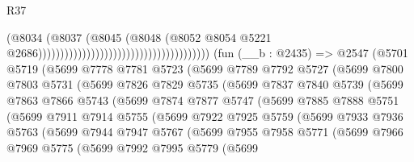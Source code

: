 \begin{lexlean}{R37}
\begin{coremodule}
                                                                        (@8034
                                                                          (@8037
                                                                            (@8045
                                                                              (@8048
                                                                                (@8052
                                                                                  @8054
                                                                                  @5221
                                                                                  @2686)))))))))))))))))))))))))))))))))))))))
    (fun (__b : @2435) =>
    @2547
      (@5701
        @5719
        (@5699
          @7778
          @7781
          @5723
          (@5699
            @7789
            @7792
            @5727
            (@5699
              @7800
              @7803
              @5731
              (@5699
                @7826
                @7829
                @5735
                (@5699
                  @7837
                  @7840
                  @5739
                  (@5699
                    @7863
                    @7866
                    @5743
                    (@5699
                      @7874
                      @7877
                      @5747
                      (@5699
                        @7885
                        @7888
                        @5751
                        (@5699
                          @7911
                          @7914
                          @5755
                          (@5699
                            @7922
                            @7925
                            @5759
                            (@5699
                              @7933
                              @7936
                              @5763
                              (@5699
                                @7944
                                @7947
                                @5767
                                (@5699
                                  @7955
                                  @7958
                                  @5771
                                  (@5699
                                    @7966
                                    @7969
                                    @5775
                                    (@5699
                                      @7992
                                      @7995
                                      @5779
                                      (@5699

\end{coremodule}
\end{lexlean}
